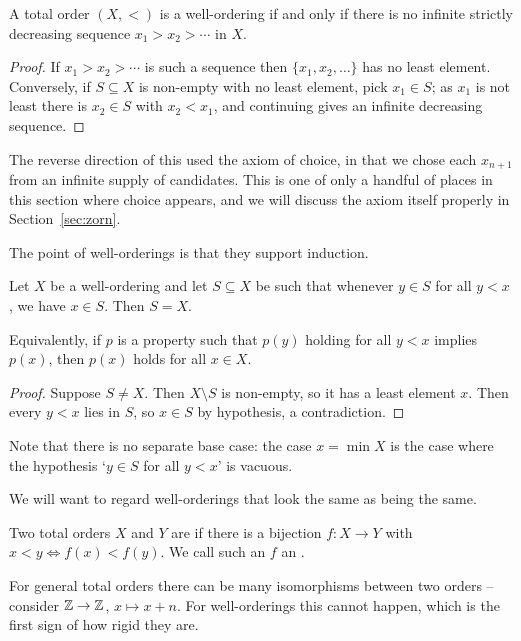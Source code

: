 \documentclass[a4paper]{scrartcl}
\begin{document}
\begin{proposition}
  A total order $(X, <)$ is a well-ordering if and only if there is no infinite strictly decreasing sequence $x_1 > x_2 > \cdots$ in $X$.
\end{proposition}
\begin{proof}
  If $x_1 > x_2 > \cdots$ is such a sequence then $\{x_1, x_2, \dots\}$ has no least element. Conversely, if $S \subseteq X$ is non-empty with no least element, pick $x_1 \in S$; as $x_1$ is not least there is $x_2 \in S$ with $x_2 < x_1$, and continuing gives an infinite decreasing sequence.
\end{proof}

The reverse direction of this used the axiom of choice, in that we chose each $x_{n+1}$ from an infinite supply of candidates. This is one of only a handful of places in this section where choice appears, and we will discuss the axiom itself properly in Section~\ref{sec:zorn}.

The point of well-orderings is that they support induction.

\begin{proposition}\label{prop:woinduction}
  Let $X$ be a well-ordering and let $S \subseteq X$ be such that whenever $y \in S$ for all $y < x$, we have $x \in S$. Then $S = X$.

  Equivalently, if $p$ is a property such that $p(y)$ holding for all $y < x$ implies $p(x)$, then $p(x)$ holds for all $x \in X$.
\end{proposition}
\begin{proof}
  Suppose $S \neq X$. Then $X \setminus S$ is non-empty, so it has a least element $x$. Then every $y < x$ lies in $S$, so $x \in S$ by hypothesis, a contradiction.
\end{proof}

Note that there is no separate base case: the case $x = \min X$ is the case where the hypothesis `$y \in S$ for all $y < x$' is vacuous.

We will want to regard well-orderings that look the same as being the same.

\begin{definition}
  Two total orders $X$ and $Y$ are  if there is a bijection $f: X \rightarrow Y$ with $x < y \iff f(x) < f(y)$. We call such an $f$ an .
\end{definition}

For general total orders there can be many isomorphisms between two orders -- consider $\mathbb{Z} \to \mathbb{Z}$, $x \mapsto x + n$. For well-orderings this cannot happen, which is the first sign of how rigid they are.
\end{document}
